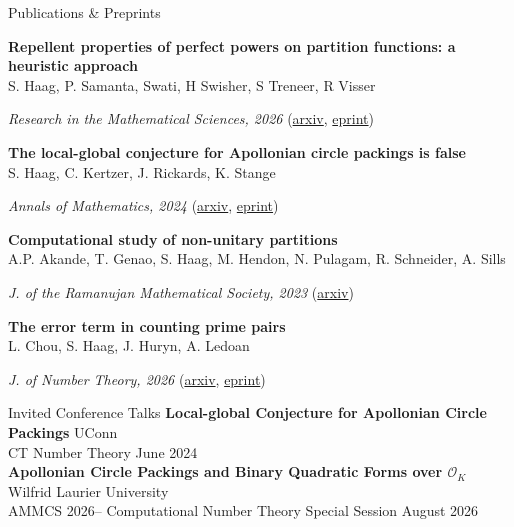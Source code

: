 \documentclass{resume} %
\begin{document}
\begin{rSection}{Publications \& Preprints}

\textbf{Repellent properties of perfect powers on partition functions: a heuristic approach} \\
    S. Haag, P. Samanta, Swati, H Swisher, S Treneer, R Visser \begin{FlushRight}\textit{Research in the Mathematical Sciences, 2026} (\href{https://arxiv.org/abs/2601.18138}{arxiv}, \href{https://rdcu.be/ff8VW}{eprint}) \end{FlushRight}
\textbf{The local-global conjecture for Apollonian circle packings is false} \\
 	 S. Haag, C. Kertzer, J. Rickards, K. Stange \begin{FlushRight} \textit{Annals of Mathematics, 2024} (\href{https://arxiv.org/abs/2307.02749}{arxiv}, \href{https://annals.math.princeton.edu/2024/200-2/p06}{eprint}) \end{FlushRight}
\textbf{Computational study of non-unitary partitions}  \\
     A.P. Akande, T. Genao, S. Haag, M. Hendon, N. Pulagam, R. Schneider, A. Sills  \begin{FlushRight}
      \textit{J. of the Ramanujan Mathematical Society, 2023} (\href{https://arxiv.org/abs/2112.03264}{arxiv})\end{FlushRight}
\textbf{The error term in counting prime pairs}  \\
     L. Chou, S. Haag, J. Huryn, A. Ledoan \begin{FlushRight} \textit{J. of Number Theory, 2026} (\href{https://arxiv.org/abs/2308.14888}{arxiv}, \href{https://doi.org/10.1016/j.jnt.2025.04.009}{eprint}) \end{FlushRight} 
     

\end{rSection}


\begin{rSection}{Invited Conference Talks}
 \textbf{Local-global Conjecture for Apollonian Circle Packings } \hfill UConn \\
 	 CT Number Theory \hfill June 2024 \\

\textbf{Apollonian Circle Packings and Binary Quadratic Forms over $\mathcal{O}_K$} \hfill Wilfrid Laurier University\\
 	 AMMCS 2026-- Computational Number Theory Special Session  \hfill August 2026 \\ \\


\end{rSection}
\end{document}
